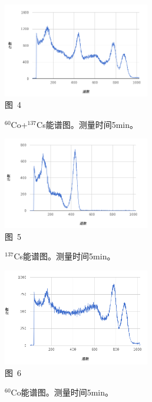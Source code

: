 \documentclass[a4paper,10.0pt,twoside]{npr}
\begin{document}
\begin{multicols}{2}
\begin{center}
   \includegraphics[width=0.48\textwidth]{CSCO.png}
\\
\xiaowu\song 图~4\begin{minipage}[t]{75mm} \quad $^{60}$Co+$^{137}$Cs能谱图。测量时间5min。\\[-1mm]\wuhao
\end{minipage}
\end{center}
\begin{center}
   \includegraphics[width=0.48\textwidth]{CS.png}
\\
\xiaowu\song 图~5\begin{minipage}[t]{75mm} \quad $^{137}$Cs能谱图。测量时间5min。\\[-1mm]\wuhao
\end{minipage}
\end{center}
\begin{center}
   \includegraphics[width=0.48\textwidth]{CO.png}
\\
\xiaowu\song 图~6\begin{minipage}[t]{75mm} \quad $^{60}$Co能谱图。测量时间5min。\\[-1mm]\wuhao
\end{minipage}
\end{center}


\end{multicols}
\end{document}
